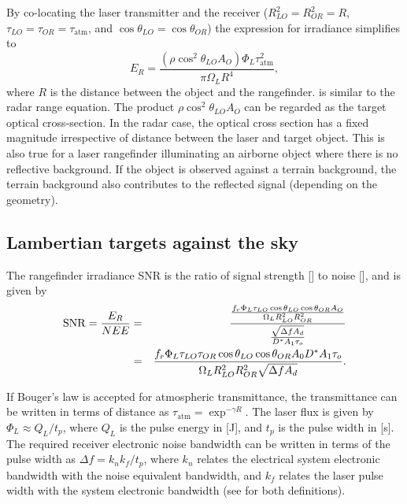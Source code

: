 By co-locating the laser transmitter and the receiver ($R^2_{LO}=R^2_{OR}=R$, $\tau_{LO}=\tau_{OR}=\tau_\textrm{atm}$, and $\cos\theta_{LO}= \cos\theta_{OR}$) the expression for irradiance simplifies to
\begin{equation}
E_R = \frac{
(\rho \cos^2\theta_{LO} A_O)
\Phi_L \tau_\textrm{atm}^2
}{
\pi \Omega_L R^4
},\label{radar}
\end{equation}
where $R$ is the distance between the object and the rangefinder.
 is similar to the radar range equation. The product $\rho\cos^2\theta_{LO} A_O$ can be regarded as the target optical cross-section. In the radar case, the optical cross section has a fixed magnitude irrespective of distance between the laser and target object. This is also true for a laser rangefinder illuminating an airborne object where there is no reflective background.  If the object is observed against a terrain background, the terrain background also contributes to the reflected signal (depending on the geometry).



\subsection{Lambertian targets against the sky}

\noindent
The rangefinder irradiance SNR is the ratio of signal strength
[] to noise [], and is given by
\begin{eqnarray}
\operatorname{SNR} = \frac{E_R}{NEE}&=&\frac{
\frac{
f_r  \Phi_L \tau_{LO} \cos\theta_{LO} \cos\theta_{OR} A_O
}{
 \Omega_L R^2_{LO}R^2_{OR} }
}{\frac{\sqrt{\Delta f A_d}}{D^\ast A_1 \tau_o}}\\
&=&\frac{f_r \Phi_L
\tau_{LO}\tau_{OR} \cos\theta_{LO} \cos\theta_{OR}A_0D^\ast A_1 \tau_o}
{\Omega_L R^2_{LO}R^2_{OR}
\sqrt{\Delta f A_d}}.
\end{eqnarray}

If Bouger's law is accepted for atmospheric transmittance, the transmittance can be written in terms of distance as $\tau_\textrm{atm}=\exp^{-\gamma R}$. The laser flux is given by $\Phi_L\approx Q_L/t_p$, where $Q_L$ is the pulse
energy in [J], and $t_p$ is the pulse width in [s]. The required receiver
electronic noise bandwidth can be written in terms of the pulse width as
$\Delta f=k_nk_f/t_p$, where 
$k_n$ relates the electrical system electronic bandwidth with the noise equivalent bandwidth, and 
$k_f$ relates the laser pulse width with the system electronic bandwidth (see \cite{Willers2013} for both definitions).

